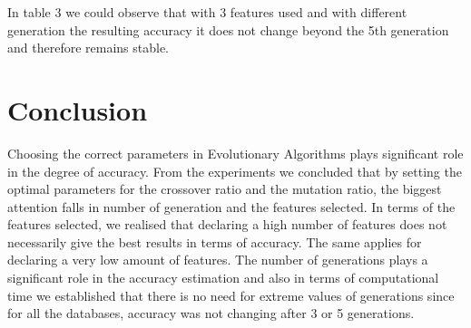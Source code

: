 \documentclass[11pt,onecolumn,a4paper]{article}
\begin{document}
 \begin{table}[h!]
 \caption{Red Wine Varying Generations, 3 Features}
 
 \end{table}
 In table 3 we could observe that with 3 features used and with different generation the resulting accuracy it does not change beyond the 5th generation and therefore remains stable.

\section{Conclusion}
Choosing the correct parameters in Evolutionary Algorithms plays significant role in the degree of accuracy. From the experiments we concluded that by setting the optimal parameters for the crossover ratio and the mutation ratio, the biggest attention falls in number of generation and the features selected. In terms of the features selected, we realised that declaring a high number of features does not necessarily give the best results in terms of accuracy. The same applies for declaring a very low amount of features. The number of generations plays a significant role in the accuracy estimation and also in terms of computational time we established that there is no need for extreme values of generations since for all the databases, accuracy was not changing after 3 or 5 generations.   




\newpage


{\small


}
\end{document}
